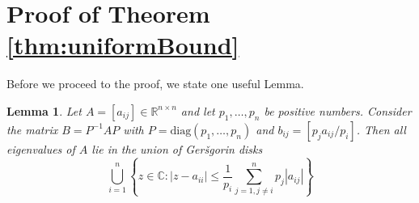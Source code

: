 \documentclass[technote, 10pt, twoside]{IEEEtran}
\theoremstyle{plain}
\newtheorem{lemma}{Lemma}
\theoremstyle{definition}
\theoremstyle{assump}
\begin{document}
\section{Proof of Theorem \ref{thm:uniformBound}}
Before we proceed to the proof, we state one useful Lemma.
\begin{lemma}{\cite[Cor. 6.1.6]{Horn1996}}
	Let $A=[a_{ij}] \in \mathbb{R}^{n\times n}$ and let $p_1, \ldots, p_n$ be positive numbers. Consider the matrix $B=P^{-1}A P$ with $P = \mathrm{diag}(p_1, \ldots, p_n)$ and $b_{ij}=[p_j a_{ij}/p_i]$. Then all eigenvalues of $A$ lie in the union of Ger\v{s}gorin disks
	\begin{equation}
		\bigcup_{i=1}^{n}\left\{ z \in \mathbb{C}: |z-a_{ii}| \leq\frac{1}{p_i} \sum_{j=1, j \neq i}^{n} p_j |a_{ij}|  \right\}
	\end{equation}
	\label{cor:diagTransf}
\end{lemma}	
\end{document}
